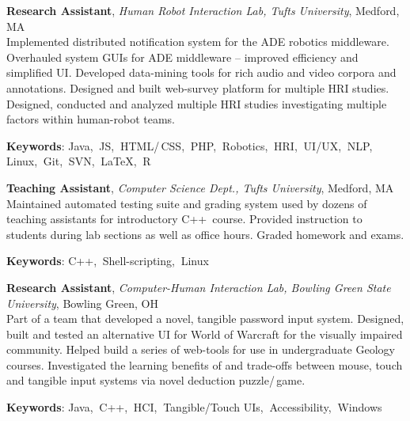 \documentclass[10pt, letter]{article}
\newcommand{\years}[1]{\marginnote{\footnotesize #1}}
\newenvironment{desc*}{
  \begin{description}
    \setlength{\itemsep}{0.2pt}
    \setlength{\parskip}{-1pt}
    \setlength{\parsep}{0pt}
  }{
  \end{description}
}
\begin{document}
\vspace{-.2cm}
\years{2012 - 2014} 
\textbf{\fontsize{10.5pt}{1em}\selectfont Research Assistant}, 
\textsl{Human Robot Interaction Lab, Tufts University}, Medford, MA\\ 

\vspace{-.3cm} 
Implemented distributed notification system for the ADE robotics
middleware. Overhauled system GUIs for ADE middleware -- improved
efficiency and simplified UI. Developed data-mining tools for rich
audio and video corpora and annotations. Designed and built web-survey
platform for multiple HRI studies. Designed, conducted and analyzed
multiple HRI studies investigating multiple factors within human-robot
teams.
\vspace{-.1cm}
\begin{desc*}
\item[\rm \color{Green} \textbf{Keywords}:] Java,$\:$ JS,$\:$ HTML/\,CSS,$\:$ PHP,$\:$ Robotics,$\:$
  HRI,$\:$ UI/UX,$\:$ NLP,$\:$ Linux,$\:$ Git,$\:$ SVN,$\:$ \LaTeX,$\:$ R\\
\end{desc*}

\vspace{-.2cm}
\years{2012, 2013} 
\textbf{\fontsize{10.5pt}{1em}\selectfont Teaching Assistant}, 
\textsl{Computer Science Dept., Tufts University}, Medford, MA \\ 

\vspace{-.3cm}
Maintained automated testing suite and grading system used by dozens
of teaching assistants for introductory C++\, course. Provided
instruction to students during lab sections as well as office hours.
Graded homework and exams.
\vspace{-.1cm}
\begin{desc*}
\item[\rm \color{Green} \textbf{Keywords}:] C++,$\:$ Shell-scripting,$\:$ Linux\\
\end{desc*}

\vspace{-.2cm}
\years{2010 - 2012}
\textbf{\fontsize{10.5pt}{1em}\selectfont Research Assistant}, 
\textsl{Computer-Human Interaction Lab, Bowling Green State
  University}, Bowling Green, OH \\

\vspace{-.3cm}
Part of a team that developed a novel, tangible password input system.
Designed, built and tested an alternative UI for World of Warcraft for
the visually impaired community. Helped build a series of web-tools
for use in undergraduate Geology courses. Investigated the learning
benefits of and trade-offs between mouse, touch and tangible input
systems via novel deduction puzzle/\,game.
\vspace{-.1cm}
\begin{desc*}
\item[\rm \color{Green} \textbf{Keywords}:] Java,$\:$ C++,$\:$ HCI,$\:$ Tangible/Touch UIs,$\:$ Accessibility,$\:$ Windows\\
\end{desc*}
\end{document}
